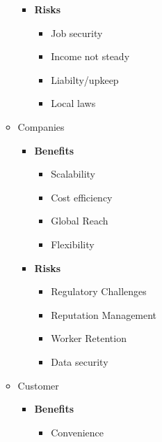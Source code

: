 \documentclass{report}
\begin{document}
\begin{itemize}
\begin{itemize}[label=$\circ$]
\begin{itemize}
\begin{itemize}[label=$\circ$]
                        \end{itemize}
                         \item \textbf{Risks}
                             \begin{itemize}[label=$\circ$]
                                 \item Job security
                                 \item Income not steady
                                 \item Liabilty/upkeep
                                 \item Local laws
                             \end{itemize}
                \end{itemize}
            \item Companies
                \begin{itemize}[label=$\circ$]
                    \item \textbf{Benefits}
                        \begin{itemize}[label=$\circ$]
                            \item Scalability
                            \item Cost efficiency
                            \item Global Reach
                            \item Flexibility
                        \end{itemize}
                    \item \textbf{Risks}
                        \begin{itemize}[label=$\circ$]
                         \item Regulatory Challenges
                         \item Reputation Management
                            \item Worker Retention
                            \item Data security
                        \end{itemize}
                \end{itemize}
            \item Customer
                \begin{itemize}[label=$\circ$]
                    \item \textbf{Benefits}
                    \begin{itemize}[label=$\circ$]
                        \item Convenience

\end{itemize}
\end{itemize}
\end{itemize}
\end{itemize}
\end{document}
